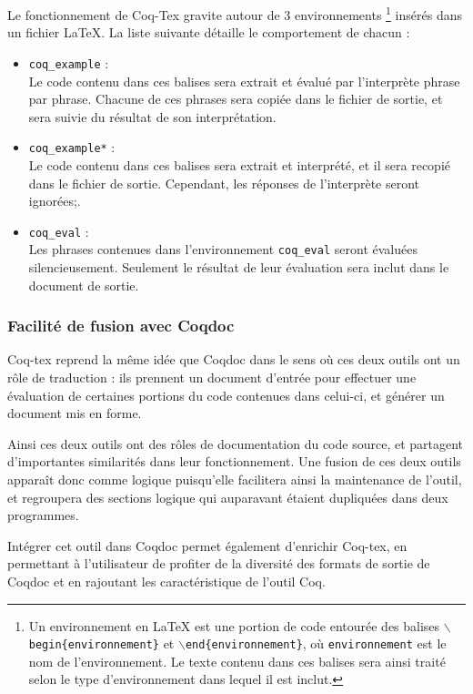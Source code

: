 \documentclass[a4paper, 11pt]{report}
\begin{document}
    Le fonctionnement de Coq-Tex gravite autour de 3 environnements \footnote{Un
    environnement en LaTeX est une portion de code entourée des balises
    \texttt{$\backslash$begin\{environnement\}} et
    \texttt{$\backslash$end\{environnement\}}, où \texttt{environnement} est
    le nom de l'environnement. Le texte contenu dans ces balises sera ainsi
    traité selon le type d'environnement dans lequel il est inclut.}
    insérés
    dans un fichier LaTeX. La liste suivante détaille le comportement de
    chacun :
    \begin{itemize}
      \item \texttt{coq\_example} : \\
        Le code contenu dans ces balises sera extrait et évalué par
        l'interprète phrase par phrase. Chacune de ces phrases sera copiée
        dans le fichier de sortie, et sera suivie du résultat de son
        interprétation.
      \item \texttt{coq\_example*} : \\
        Le code contenu dans ces balises sera extrait et interprété, et il
        sera recopié dans le fichier de sortie. Cependant, les réponses de
        l'interprète seront ignorées;.
      \item \texttt{coq\_eval} : \\
        Les phrases contenues dans l'environnement \texttt{coq\_eval} seront
        évaluées silencieusement. Seulement le résultat de leur évaluation sera
        inclut dans le document de sortie.
    \end{itemize}

    \subsubsection{Facilité de fusion avec Coqdoc}
    Coq-tex reprend la même idée que Coqdoc dans le sens où ces deux outils
    ont un rôle de traduction : ils prennent un document d'entrée pour effectuer
    une évaluation de certaines portions du code contenues dans celui-ci, et
    générer un document mis en forme.

    Ainsi ces deux outils ont des rôles de documentation du code source, et
    partagent d'importantes similarités dans leur fonctionnement. Une fusion
    de ces deux outils apparaît donc comme logique puisqu'elle facilitera
    ainsi la maintenance de l'outil, et regroupera des sections logique qui
    auparavant étaient dupliquées dans deux programmes.

    Intégrer cet outil dans Coqdoc permet également d'enrichir Coq-tex, en
    permettant à l'utilisateur de profiter de la diversité des formats de
    sortie de Coqdoc et en rajoutant les caractéristique de l'outil Coq.
\end{document}
